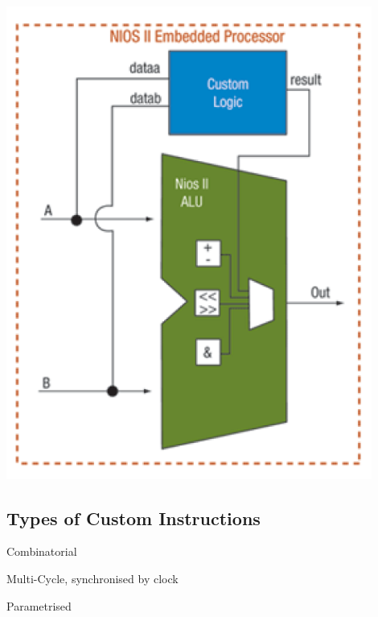 		\begin{minipage}[H]{0.2\textwidth}
			\includegraphics[width=0.9\textwidth]{./pictures/custom_instruction.png} 
		\end{minipage}
		
	\subsection{Types of Custom Instructions}
	
		\begin{compactitem}
		  \item Combinatorial
		  \item Multi-Cycle, synchronised by clock
		  \item Parametrised
		\end{compactitem}
		
